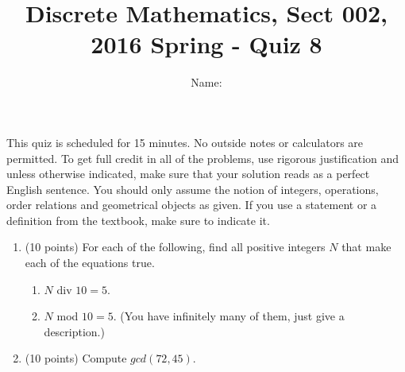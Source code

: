 \documentclass[11pt]{preprint}
\title{Discrete Mathematics, Sect 002, 2016 Spring - Quiz 8}
\author{Name:}
\institute{Courant Institute of Mathematical Sciences, NYU}
\begin{document}
\maketitle

This quiz is scheduled for 15 minutes. No outside notes or calculators are permitted. To get full credit  in all of the problems, use rigorous justification and unless otherwise indicated, make sure that your solution reads as a perfect English sentence. You should only assume the notion of integers, operations, order relations and geometrical objects as given. If you use a statement or a definition from the textbook, make sure to indicate it.
\vspace{0.2cm}

\begin{enumerate}
\item(10 points) For each of the following, find all positive integers $N$ that make each of the equations true.
\begin{enumerate}
\item $N$ div $10=5$.
\item $N$ mod $10=5$. (You have infinitely many of them, just give a description.)
\end{enumerate}
\vspace{3cm}
\item (10 points)  Compute $gcd(72,45)$.
\end{enumerate}
\end{document}
